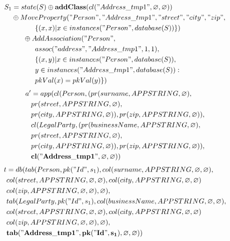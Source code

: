\documentclass[11pt]{article}
\begin{document}
\newpage
\begin{align*}
S_1 &= state(S) \oplus \mathbf{addClass}(cl("Address\_tmp1", \varnothing, \varnothing)) \\
& \oplus MoveProperty("Person", "Address\_tmp1", "street", "city", "zip", \\
& \;\;\;\;\;\; \;\;\;\;\;\;    \{(x,x) | x \in instances("Person", database(S))\}) \\
& \;\;\;\;\;\; \oplus AddAssociation("Person", \\ 
& \;\;\;\;\;\;\;\;\;\;\;\; assoc("address", "Address\_tmp1", 1, 1),\\ 
& \;\;\;\;\;\;\;\;\;\;\;\; \{(x,y)| x \in instances("Person", database(S)), \\
& \;\;\;\;\;\; \;\;\;\;\;\; y \in instances("Address\_tmp1", database(S)) : \\ 
& \;\;\;\;\;\;\;\;\;\;\;\; pkVal(x) = pkVal(y) \})
\end{align*}
\hline
\begin{align*}
a' &= app(cl(Person, (pr(surname, APPSTRING, \varnothing), \\
& pr(street, APPSTRING, \varnothing), \\
& pr(city, APPSTRING, \varnothing)), pr(zip, APPSTRING, \varnothing)), \\
& cl(LegalParty, (pr(businessName, APPSTRING, \varnothing), \\
& pr(street, APPSTRING, \varnothing), \\
& pr(city, APPSTRING, \varnothing)), pr(zip, APPSTRING, \varnothing)),\\
& \mathbf{cl("Address\_tmp1", \varnothing, \varnothing)}
 )
\end{align*}
\begin{align*}
t &= db(tab(Person, pk("Id", s_1), col(surname, APPSTRING, \varnothing, \varnothing), \\
& col(street, APPSTRING, \varnothing, \varnothing), col(city, APPSTRING, \varnothing, \varnothing) \\
& col(zip, APPSTRING, \varnothing, \varnothing), \varnothing), \\
& tab(LegalParty, pk("Id", s_1),  col(businessName, APPSTRING, \varnothing, \varnothing), \\
& col(street, APPSTRING, \varnothing, \varnothing), col(city, APPSTRING, \varnothing, \varnothing) \\
& col(zip, APPSTRING, \varnothing, \varnothing), \varnothing), \\
& \mathbf{tab("Address\_tmp1", pk("Id", s_1), \varnothing, \varnothing)}) 
\end{align*}
\end{document}
